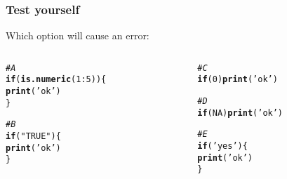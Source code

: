 \documentclass[12pt]{beamer}\usepackage[]{graphicx}\usepackage[]{color}
\makeatletter
\newcommand{\hlnum}[1]{\textcolor[rgb]{0.686,0.059,0.569}{#1}}%
\newcommand{\hlstr}[1]{\textcolor[rgb]{0.192,0.494,0.8}{#1}}%
\newcommand{\hlcom}[1]{\textcolor[rgb]{0.678,0.584,0.686}{\textit{#1}}}%
\newcommand{\hlopt}[1]{\textcolor[rgb]{0,0,0}{#1}}%
\newcommand{\hlstd}[1]{\textcolor[rgb]{0.345,0.345,0.345}{#1}}%
\newcommand{\hlkwa}[1]{\textcolor[rgb]{0.161,0.373,0.58}{\textbf{#1}}}%
\newcommand{\hlkwd}[1]{\textcolor[rgb]{0.737,0.353,0.396}{\textbf{#1}}}%
\newenvironment{kframe}{%
 \def\at@end@of@kframe{}%
 \ifinner\ifhmode%
  \def\at@end@of@kframe{\end{minipage}}%
  \begin{minipage}{\columnwidth}%
 \fi\fi%
 \def\FrameCommand##1{\hskip\@totalleftmargin \hskip-\fboxsep
 \colorbox{shadecolor}{##1}\hskip-\fboxsep
     \hskip-\linewidth \hskip-\@totalleftmargin \hskip\columnwidth}%
 \MakeFramed {\advance\hsize-\width
   \@totalleftmargin\z@ \linewidth\hsize
   \@setminipage}}%
 {\par\unskip\endMakeFramed%
 \at@end@of@kframe}
\newenvironment{knitrout}{}{} %
\makeatother
\begin{document}
\begin{frame}[fragile]
\frametitle{Test yourself}

Which option will cause an error:
\begin{columns}[t]
\begin{column}{0.45\textwidth}
\begin{knitrout}\footnotesize
{}\color{fgcolor}\begin{kframe}
\begin{alltt}
\hlcom{# A}
\hlkwa{if} \hlstd{(}\hlkwd{is.numeric}\hlstd{(}\hlnum{1}\hlopt{:}\hlnum{5}\hlstd{)) \{}
  \hlkwd{print}\hlstd{(}\hlstr{'ok'}\hlstd{)}
\hlstd{\}}


\hlcom{# B}
\hlkwa{if} \hlstd{(}\hlstr{"TRUE"}\hlstd{) \{}
  \hlkwd{print}\hlstd{(}\hlstr{'ok'}\hlstd{)}
\hlstd{\}}
\end{alltt}
\end{kframe}
\end{knitrout}
\end{column}

\begin{column}{0.45\textwidth}
\begin{knitrout}\footnotesize
{}\color{fgcolor}\begin{kframe}
\begin{alltt}
\hlcom{# C}
\hlkwa{if} \hlstd{(}\hlnum{0}\hlstd{)} \hlkwd{print}\hlstd{(}\hlstr{'ok'}\hlstd{)}


\hlcom{# D}
\hlkwa{if} \hlstd{(}\hlnum{NA}\hlstd{)} \hlkwd{print}\hlstd{(}\hlstr{'ok'}\hlstd{)}


\hlcom{# E}
\hlkwa{if} \hlstd{(}\hlstr{'yes'}\hlstd{) \{}
  \hlkwd{print}\hlstd{(}\hlstr{'ok'}\hlstd{)}
\hlstd{\}}
\end{alltt}
\end{kframe}
\end{knitrout}
\end{column}
\end{columns}

\end{frame}


\begin{frame}
\begin{center}
\Huge{}
\end{center}
\end{frame}

\end{document}
